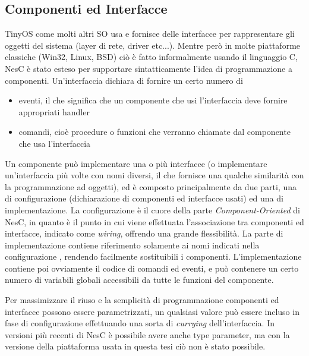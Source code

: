 \documentclass[twoside,11pt,a4paper,italian,openany]{book}
\begin{document}
 

\subsection{Componenti ed Interfacce}
TinyOS come molti altri SO usa e fornisce delle interfacce per rappresentare gli oggetti del 
sistema (layer di rete, driver etc...). 
Mentre però in molte piattaforme classiche (Win32, Linux, BSD) ciò è fatto informalmente 
usando il linguaggio C, NesC è stato esteso per supportare sintatticamente l'idea di 
programmazione a componenti. 
Un'interfaccia dichiara di fornire un certo numero di 
\begin{itemize}

\item{eventi, il che significa che un componente che usi l'interfaccia deve fornire appropriati
handler} 

\item{comandi, cioè procedure o funzioni che verranno chiamate dal componente che usa l'interfaccia}
\end{itemize}

Un componente può implementare una o più interfacce (o implementare un'interfaccia più volte 
con nomi diversi, il che fornisce una qualche similarità con la programmazione ad oggetti), 
ed è composto principalmente da due parti, una di configurazione 
(dichiarazione di componenti ed interfacce usati) ed una di implementazione.
La configurazione è il cuore della parte \emph{Component-Oriented} di NesC, in quanto è 
il punto in cui viene effettuata l'associazione tra componenti ed interfacce, indicato come 
\emph{wiring}, offrendo una grande flessibilità. 
La parte di implementazione contiene riferimento solamente ai nomi indicati nella configurazione
, rendendo facilmente sostituibili i componenti.
L'implementazione contiene poi ovviamente il codice di comandi ed eventi, e può contenere un 
certo numero di variabili globali accessibili da tutte le funzioni del componente. 

Per massimizzare il riuso e la semplicità di programmazione componenti ed interfacce possono 
essere parametrizzati, un qualsiasi valore può essere 
incluso in fase di configurazione effettuando una sorta di \emph{currying} dell'interfaccia. 
In versioni più recenti di NesC è possibile avere anche type parameter, ma con la versione della piattaforma usata in questa tesi ciò non è stato possibile. 


\end{document}

